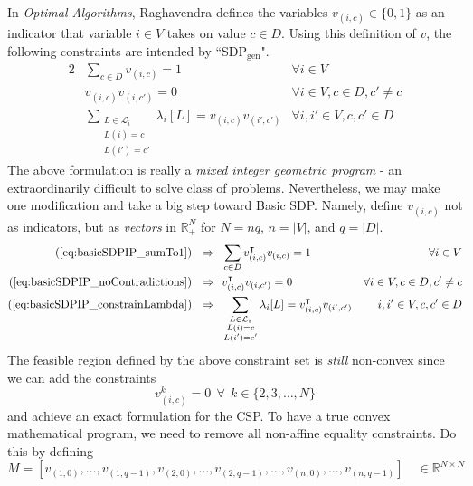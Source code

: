 In \textit{Optimal Algorithms}, Raghavendra defines the variables $v_{(i,c)} \in  \{0,1\}$ as an indicator that variable $i \in V$ takes on value $c \in D$. Using this definition of $v$, the following constraints are intended by ``$\text{SDP}_{\text{gen}}$".
\begin{alignat}{2}
&\sum_{c \in D} v_{(i,c)} = 1 & \forall i \in V \label{eq:basicSDPIP_sumTo1} \\
&v_{(i,c)}v_{(i,c')} = 0        & \forall i \in V , c \in D, c' \neq c \label{eq:basicSDPIP_noContradictions} \\
&\sum_{\substack{L \in \mathcal{L}_i \\ L(i) = c \\ L(i') = c' }} \lambda_i[L] = v_{(i,c)}v_{(i',c')} & \forall i,i' \in V, c,c' \in D \label{eq:basicSDPIP_constrainLambda}
\end{alignat}
The above formulation is really a \textit{mixed integer geometric program} - an extraordinarily difficult to solve class of problems. Nevertheless, we may make one modification and take a big step toward Basic SDP. Namely, define $v_{(i,c)}$ not as indicators, but as \textit{vectors} in $\mathbb{R}^{N}_+$ for $N = n q$, $n = |V|$, and $q = |D|$.
\begin{alignat}{2}
(\ref{eq:basicSDPIP_sumTo1}) ~~\Rightarrow & ~~\sum_{c \in D} v_{(i,c)}^\intercal v_{(i,c)} = 1 & \forall i \in V \label{eq:basicSDPnearCVX_sumTo1} \\
(\ref{eq:basicSDPIP_noContradictions}) ~~\Rightarrow &~~v_{(i,c)}^\intercal v_{(i,c')} = 0 & \forall i \in V, c \in D, c' \neq c \label{eq:basicSDPnearCVX_noContradictions} \\
(\ref{eq:basicSDPIP_constrainLambda})~~ \Rightarrow & ~~\sum_{\substack{L \in \mathcal{L}_i \\ L(i) = c \\ L(i') = c' }} \lambda_i[L] = v_{(i,c)}^\intercal v_{(i',c')} &  i,i' \in V, c,c' \in D \label{eq:basicSDPnearCVX_constrainLambda}
\end{alignat}
The feasible region defined by the above constraint set is \textit{still} non-convex since we can add the constraints
\begin{equation}
v^k_{(i,c)} = 0 ~~ \forall ~~ k \in \{2,3,\ldots,N\} 
\end{equation}
and achieve an exact formulation for the CSP. To have a true convex mathematical program, we need to remove all non-affine equality constraints. Do this by defining
\begin{equation}
M = [v_{(1,0)},\ldots,v_{(1,q-1)},
	v_{(2,0)},\ldots,v_{(2,q-1)},\ldots,
	v_{(n,0)},\ldots,v_{(n,q-1)}] \quad  \in \mathbb{R}^{N \times N}
\end{equation}
